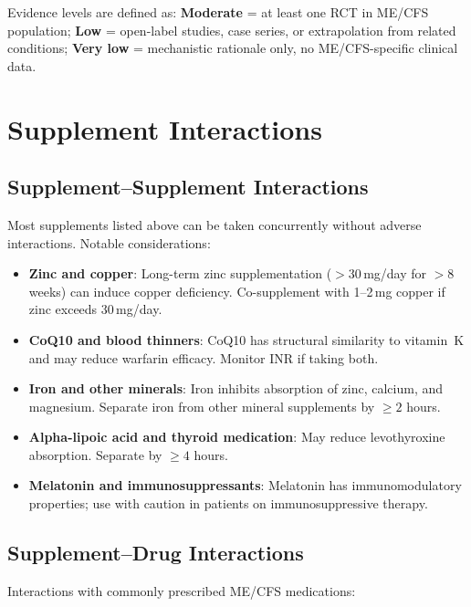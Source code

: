 Evidence levels are defined as: \textbf{Moderate} = at least one RCT in ME/CFS population; \textbf{Low} = open-label studies, case series, or extrapolation from related conditions; \textbf{Very low} = mechanistic rationale only, no ME/CFS-specific clinical data.

\section{Supplement Interactions}
\label{sec:supplement-interactions}

\subsection{Supplement--Supplement Interactions}

Most supplements listed above can be taken concurrently without adverse interactions. Notable considerations:

\begin{itemize}
    \item \textbf{Zinc and copper}: Long-term zinc supplementation ($>30$\,mg/day for $>8$ weeks) can induce copper deficiency. Co-supplement with 1--2\,mg copper if zinc exceeds 30\,mg/day.
    \item \textbf{CoQ10 and blood thinners}: CoQ10 has structural similarity to vitamin~K and may reduce warfarin efficacy. Monitor INR if taking both.
    \item \textbf{Iron and other minerals}: Iron inhibits absorption of zinc, calcium, and magnesium. Separate iron from other mineral supplements by $\geq 2$ hours.
    \item \textbf{Alpha-lipoic acid and thyroid medication}: May reduce levothyroxine absorption. Separate by $\geq 4$ hours.
    \item \textbf{Melatonin and immunosuppressants}: Melatonin has immunomodulatory properties; use with caution in patients on immunosuppressive therapy.
\end{itemize}

\subsection{Supplement--Drug Interactions}

Interactions with commonly prescribed ME/CFS medications:

